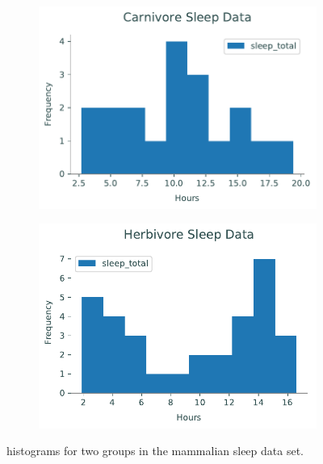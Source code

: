 \begin{figure}[H] %
\captionsetup[subfigure]{justification=centering}
\centering
\begin{subfigure}{.495\textwidth}
    \centering
    \includegraphics[width=\textwidth]{figures/mammal_hist_carni.pdf}
\end{subfigure}
%
\begin{subfigure}{.495\textwidth}
    \centering
    \includegraphics[width=\textwidth]{figures/mammal_hist_herbi.pdf}
\end{subfigure}
\caption{ histograms for two groups in the mammalian sleep data set.}
\end{figure}

